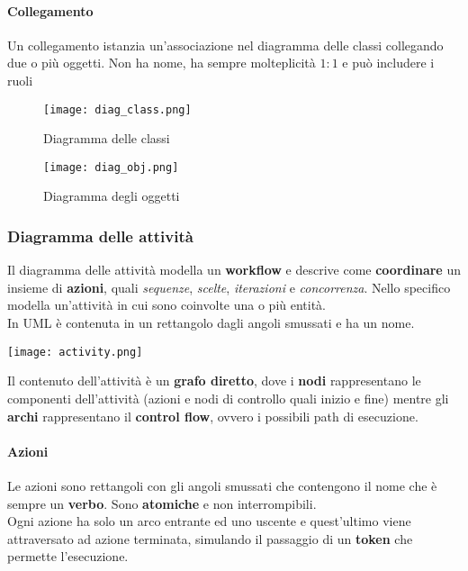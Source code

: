 \paragraph{Collegamento} Un collegamento istanzia un'associazione nel diagramma delle classi collegando due o più oggetti. Non ha nome, ha sempre molteplicità $1:1$ e può includere i ruoli

\begin{figure}[!h]
	\centering
	\begin{minipage}[b]{0.5\textwidth}
		\texttt{[image: diag\_class.png]}
		\caption{Diagramma delle classi}
	\end{minipage}
	\hfill
	\begin{minipage}[b]{0.4\textwidth}
		\texttt{[image: diag\_obj.png]}
		\caption{Diagramma degli oggetti}
	\end{minipage}
\end{figure}

\subsubsection{Diagramma delle attività}
Il diagramma delle attività modella un \textbf{workflow} e descrive come \textbf{coordinare} un insieme di \textbf{azioni}, quali \textit{sequenze}, \textit{scelte}, \textit{iterazioni} e \textit{concorrenza}.
Nello specifico modella un'attività in cui sono coinvolte una o più entità.\\
In UML è contenuta in un rettangolo dagli angoli smussati e ha un nome.
\begin{center}
	\texttt{[image: activity.png]}
\end{center}
Il contenuto dell'attività è un \textbf{grafo diretto}, dove i \textbf{nodi} rappresentano le componenti dell'attività (azioni e nodi di controllo quali inizio e fine) mentre gli \textbf{archi} rappresentano il \textbf{control flow}, ovvero i possibili path di esecuzione.

\paragraph{Azioni} Le azioni sono rettangoli con gli angoli smussati che contengono il nome che è sempre un \textbf{verbo}. Sono \textbf{atomiche} e non interrompibili.\\
Ogni azione ha solo un arco entrante ed uno uscente e quest'ultimo viene attraversato ad azione terminata, simulando il passaggio di un \textbf{token} che permette l'esecuzione.

